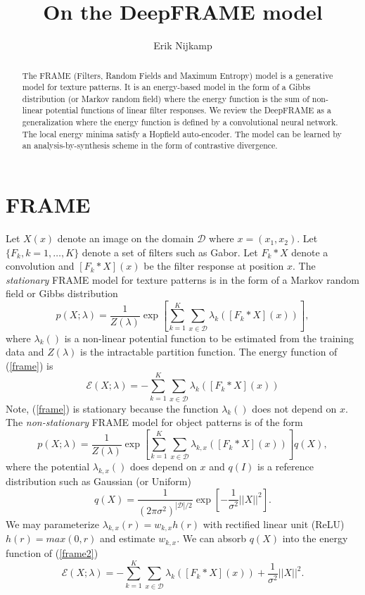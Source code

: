 \documentclass[11pt]{article}
\def\D{\mathcal{D}}
\def\En{\mathcal{E}}
\def\I{X}
\begin{document}
	
\title{On the DeepFRAME model}
\author{Erik Nijkamp}
\date{}
\maketitle

\begin{abstract}
The FRAME (Filters, Random Fields and Maximum Entropy) model \citep{ZhuWM97} is a generative model for texture patterns. It is an energy-based model in the form of a Gibbs distribution (or Markov random field) where the energy function is the sum of non-linear potential functions of linear filter responses. We review the DeepFRAME \citep{xie} as a generalization where the energy function is defined by a convolutional neural network. The local energy minima satisfy a Hopfield auto-encoder. The model can be learned by an analysis-by-synthesis scheme in the form of contrastive divergence.
\end{abstract}

\section{FRAME}
Let $\I(x)$ denote an image on the domain $\D$ where $x=(x_1,x_2)$. Let $\{F_k,k=1,\ldots,K\}$ denote a set of filters such as Gabor. Let $F_k*\I$ denote a convolution and $[F_k*\I](x)$ be the filter response at position $x$.
The \textit{stationary} FRAME model for texture patterns is in the form of a Markov random field or Gibbs distribution
\begin{equation}
p(\I;\lambda)=\frac{1}{Z(\lambda)}\exp\left[ \sum_{k=1}^K \sum_{x\in\D}\lambda_k([F_k*\I](x)) \right],\label{frame}
\end{equation}
where $\lambda_k()$ is a non-linear potential function to be estimated from the training data and $Z(\lambda)$ is the intractable partition function. The energy function of (\ref{frame}) is 
\begin{equation}
\En(\I;\lambda)=-\sum_{k=1}^K \sum_{x\in\D}\lambda_k([F_k*\I](x))
\end{equation}
Note, (\ref{frame}) is stationary because the function $\lambda_k()$ does not depend on $x$.
The \textit{non-stationary} FRAME model for object patterns is of the form
\begin{equation}
p(\I;\lambda)=\frac{1}{Z(\lambda)}\exp\left[ \sum_{k=1}^K \sum_{x\in\D}\lambda_{k,x}([F_k*\I](x)) \right]q(\I),\label{frame2}
\end{equation}
where the potential $\lambda_{k,x}()$ does depend on $x$ and $q(I)$ is a reference distribution such as Gaussian (or Uniform)
\begin{equation}
q(\I)=\frac{1}{(2\pi\sigma^2)^{|\D|/2}}\exp\left[ -\frac{1}{\sigma^2} || \I ||^2 \right].\label{prior}
\end{equation}
We may parameterize $\lambda_{k,x}(r)=w_{k,x}h(r)$ with rectified linear unit (ReLU) $h(r) = max(0,r)$ and estimate $w_{k,x}$. We can absorb $q(\I)$ into the energy function of (\ref{frame2})
\begin{equation}
\En(\I;\lambda)=-\sum_{k=1}^K \sum_{x\in\D}\lambda_k([F_k*\I](x))+\frac{1}{\sigma^2} || \I ||^2.
\end{equation}
\end{document}
